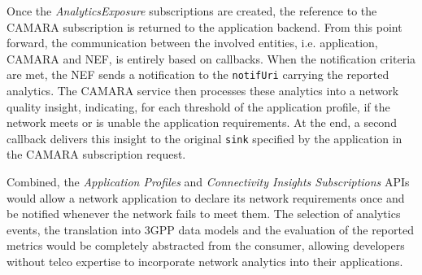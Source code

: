 Once the \textit{AnalyticsExposure} subscriptions are created, the reference to the CAMARA subscription is returned to the application backend. From this point forward, the communication between the involved entities, i.e. application, CAMARA and \acs{NEF}, is entirely based on callbacks. When the notification criteria are met, the \acs{NEF} sends a notification to the \texttt{notifUri} carrying the reported analytics. The CAMARA service then processes these analytics into a network quality insight, indicating, for each threshold of the application profile, if the network meets or is unable the application requirements. At the end, a second callback delivers this insight to the original \texttt{sink} specified by the application in the CAMARA subscription request.

Combined, the \textit{Application Profiles} and \textit{Connectivity Insights Subscriptions} \acsp{API} would allow a network application to declare its network requirements once and be notified whenever the network fails to meet them. The selection of analytics events, the translation into \acs{3GPP} data models and the evaluation of the reported metrics would  be completely abstracted from the consumer, allowing developers without telco expertise to incorporate network analytics into their applications.
